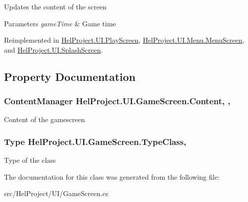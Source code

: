 Updates the content of the screen 


\begin{DoxyParams}{Parameters}
{\em game\+Time} & Game time\\
\hline
\end{DoxyParams}


Reimplemented in \hyperlink{class_hel_project_1_1_u_i_1_1_play_screen_a012a79b297f9e09a0d21dbe952a653db}{Hel\+Project.\+U\+I.\+Play\+Screen}, \hyperlink{class_hel_project_1_1_u_i_1_1_menu_1_1_menu_screen_af7295758606c3cb7124983c86a51ecae}{Hel\+Project.\+U\+I.\+Menu.\+Menu\+Screen}, and \hyperlink{class_hel_project_1_1_u_i_1_1_splash_screen_abf282bea4e6f1ee8a6ab03f812f130d3}{Hel\+Project.\+U\+I.\+Splash\+Screen}.



\subsection{Property Documentation}
\hypertarget{class_hel_project_1_1_u_i_1_1_game_screen_a50939223833b9fd49a5110bbc950c9df}{}
\subsubsection[{Content}]{\setlength{\rightskip}{0pt plus 5cm}Content\+Manager Hel\+Project.\+U\+I.\+Game\+Screen.\+Content\hspace{0.3cm}{\ttfamily [get]}, {\ttfamily [set]}, {\ttfamily [protected]}}\label{class_hel_project_1_1_u_i_1_1_game_screen_a50939223833b9fd49a5110bbc950c9df}


Content of the gamescreen 

\hypertarget{class_hel_project_1_1_u_i_1_1_game_screen_a1b6b8e12968c6b376a83fd56abb61eb6}{}
\subsubsection[{Type\+Class}]{\setlength{\rightskip}{0pt plus 5cm}Type Hel\+Project.\+U\+I.\+Game\+Screen.\+Type\+Class\hspace{0.3cm}{\ttfamily [get]}, {\ttfamily [set]}}\label{class_hel_project_1_1_u_i_1_1_game_screen_a1b6b8e12968c6b376a83fd56abb61eb6}


Type of the class 



The documentation for this class was generated from the following file\+:\begin{DoxyCompactItemize}
\item 
src/\+Hel\+Project/\+U\+I/Game\+Screen.\+cs\end{DoxyCompactItemize}
